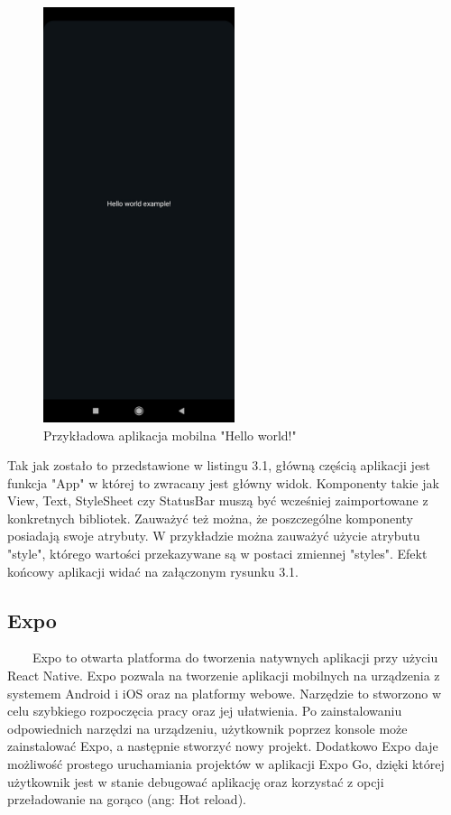 \documentclass[a4paper,12pt,oneside]{book}
\begin{document}
	\begin{figure}[H]
		\centering
		\includegraphics[width=0.5\textwidth]{grafika/hello_world.jpg}
		\caption{Przykładowa aplikacja mobilna "Hello world!"}
	\end{figure}

	Tak jak zostało to przedstawione w listingu 3.1, główną częścią aplikacji jest funkcja "App" w której to zwracany jest główny widok. Komponenty takie jak View, Text, StyleSheet czy StatusBar muszą być wcześniej zaimportowane z konkretnych bibliotek. Zauważyć też można, że poszczególne komponenty posiadają swoje atrybuty. W przykładzie można zauważyć użycie atrybutu "style", którego wartości przekazywane są w postaci zmiennej "styles". Efekt końcowy aplikacji widać na załączonym rysunku 3.1.
	
	\subsection{Expo}
	\ \ \ \
	Expo to otwarta platforma do tworzenia natywnych aplikacji przy użyciu React Native. Expo pozwala na tworzenie aplikacji mobilnych na urządzenia z systemem Android i iOS oraz na platformy webowe. Narzędzie to stworzono w celu szybkiego rozpoczęcia pracy oraz jej ułatwienia. Po zainstalowaniu odpowiednich narzędzi na urządzeniu, użytkownik poprzez konsole może zainstalować Expo, a następnie stworzyć nowy projekt. Dodatkowo Expo daje możliwość prostego uruchamiania projektów w aplikacji Expo Go, dzięki której użytkownik jest w stanie debugować aplikację oraz korzystać z opcji przeładowanie na gorąco (ang: Hot reload).
	
\end{document}
